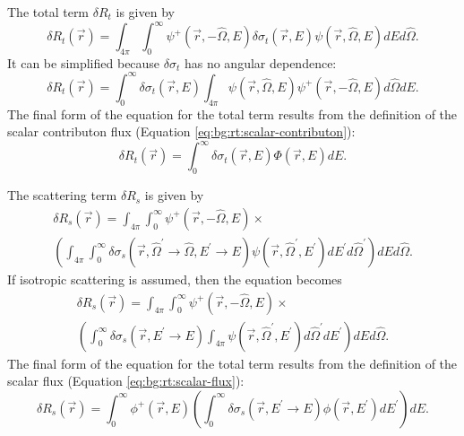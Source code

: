 The total term $\delta R_t$ is given by
\begin{equation}\label{eq:dr:dr_t_term_1}
  \delta R_t\left(\vec{r}\right) =
  \int_{4\pi}\int_0^\infty\psi^+\left(\vec{r},-\hat{\Omega},E\right)\delta\sigma_t\left(\vec{r},E\right)\psi\left(\vec{r},\hat{\Omega},E\right)dEd\hat{\Omega}.
\end{equation}
It can be simplified because $\delta\sigma_t$ has no angular dependence:
\begin{equation}\label{eq:dr:dr_t_term_2}
  \delta R_t\left(\vec{r}\right) =
  \int_0^\infty\delta\sigma_t\left(\vec{r},E\right)\int_{4\pi}\psi\left(\vec{r},\hat{\Omega},E\right)\psi^+\left(\vec{r},-\hat{\Omega},E\right)d\hat{\Omega}dE.
\end{equation}
The final form of the equation for the total term results from the definition of the scalar contributon flux (Equation \ref{eq:bg:rt:scalar-contributon}):
\begin{equation}\label{eq:dr:dr_t_term}
  \delta R_t\left(\vec{r}\right) =
  \int_0^\infty\delta\sigma_t\left(\vec{r},E\right)\Phi\left(\vec{r},E\right)dE.
\end{equation}

The scattering term $\delta R_s$ is given by
\begin{multline}\label{eq:dr:dr_s_term_1}
  \delta R_s\left(\vec{r}\right) =
  \int_{4\pi}\int_0^\infty\psi^+\left(\vec{r},-\hat{\Omega},E\right) \times \\
  \left(\int_{4\pi}\int_0^\infty\delta\sigma_s\left(\vec{r},\hat{\Omega}^\prime\rightarrow\hat{\Omega},E^\prime\rightarrow E\right)\psi\left(\vec{r},\hat{\Omega}^\prime,E^\prime\right)dE^\prime d\hat{\Omega}^\prime\right)dEd\hat{\Omega}.
\end{multline}
If isotropic scattering is assumed, then the equation becomes
\begin{multline}\label{eq:dr:dr_s_term_2}
  \delta R_s\left(\vec{r}\right) =
  \int_{4\pi}\int_0^\infty\psi^+\left(\vec{r},-\hat{\Omega},E\right) \times \\
  \left(\int_0^\infty\delta\sigma_s\left(\vec{r},E^\prime\rightarrow E\right)\int_{4\pi}\psi\left(\vec{r},\hat{\Omega}^\prime,E^\prime\right)d\hat{\Omega}^\prime dE^\prime\right)dEd\hat{\Omega}.
\end{multline}
The final form of the equation for the total term results from the definition of the scalar flux (Equation \ref{eq:bg:rt:scalar-flux}):
\begin{equation}\label{eq:dr:dr_s_term}
  \delta R_s\left(\vec{r}\right) =
  \int_0^\infty\phi^+\left(\vec{r},E\right)\left(\int_0^\infty\delta\sigma_s\left(\vec{r},E^\prime\rightarrow E\right)\phi\left(\vec{r},E^\prime\right)dE^\prime\right)dE.
\end{equation}

